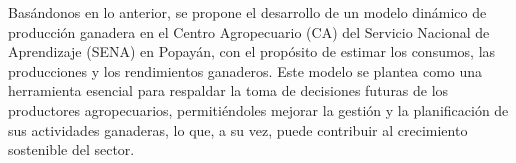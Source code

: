 Basándonos en lo anterior, se propone el desarrollo de un modelo dinámico de producción ganadera en el Centro Agropecuario (CA) del Servicio Nacional de Aprendizaje (SENA) en Popayán, con el propósito de estimar los consumos, las producciones y los rendimientos ganaderos. Este modelo se plantea como una herramienta esencial para respaldar la toma de decisiones futuras de los productores agropecuarios, permitiéndoles mejorar la gestión y la planificación de sus actividades ganaderas, lo que, a su vez, puede contribuir al crecimiento sostenible del sector.
